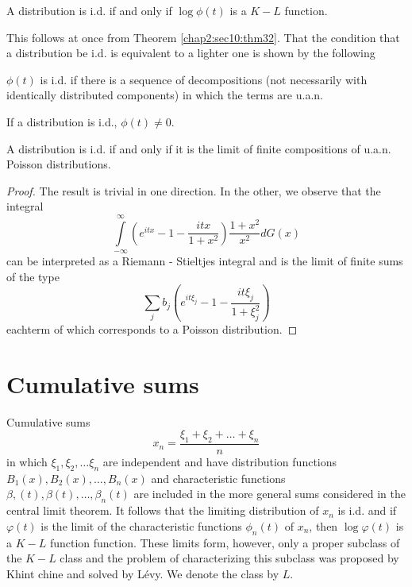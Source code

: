 \begin{theorem}\label{chap2:sec10:thm37} %
A distribution is i.d. if and only if $\log \phi(t)$ is a $K-L$ function.

  This follows at once from Theorem \ref{chap2:sec10:thm32}.  That the condition that a
  distribution be i.d. is equivalent to a lighter one is shown by the
  following 
\end{theorem}

\setcounter{corollary}{0}
\begin{corollary}\label{chap2:sec10:thm37:coro1}
$\phi (t)$ is i.d. if there is a sequence of decompositions (not
  necessarily with identically distributed components) in which the
  terms are u.a.n.  
\end{corollary}

\begin{corollary}\label{chap2:sec10:thm37:coro2}
If a distribution is i.d., $\phi (t) \neq 0$.
\end{corollary}

\begin{theorem}\label{chap2:sec10:thm38} %
A distribution is i.d. if and only if it is the limit of finite
compositions of u.a.n.  Poisson distributions.   
\end{theorem}

\begin{proof}
The result is trivial in one direction.  In the other, we observe that
the integral 
$$
\int\limits^\infty_{-\infty} \left(e^{itx} - 1 -
\frac{itx}{1+x^2}\right) \frac{1+x^2}{x^2} d G(x)
$$
can be interpreted as a Riemann - Stieltjes integral and is the limit 
of finite sums of the type 
$$
\sum_j   b_j\left(e^{it \xi_j} -1 - \frac{it
  \xi_j}{1+\xi^2_j}\right)
$$
each\pageoriginale term of which corresponds to a Poisson distribution.
\end{proof} 

\section{Cumulative sums}\label{chap2:sec11}

Cumulative sums
$$
x_n = \frac{\xi_1 + \xi_2 + \ldots + \xi_n}{n}
$$
in which $\xi_1, \xi_2, \dots \xi_n$ are independent and have
distribution functions $B_1(x), B_2(x),\ldots , B_n(x)$ and
characteristic functions  $\beta, (t), \beta(t), \ldots , \beta_n (t)$
are included in the more general sums considered in the central limit
theorem.  It follows that the limiting distribution of $x_n$ is
i.d. and if $\varphi (t)$ is the limit of the characteristic functions
$\phi_n (t)$ of $x_n$, then $\log \varphi (t)$ is a $K-L$
function function. These limits form, however, only a proper subclass
of the $K-L$ class and the problem of characterizing this subclass was
proposed by Khint chine and solved by L\'evy.  We denote the class by
$L$. 
 
